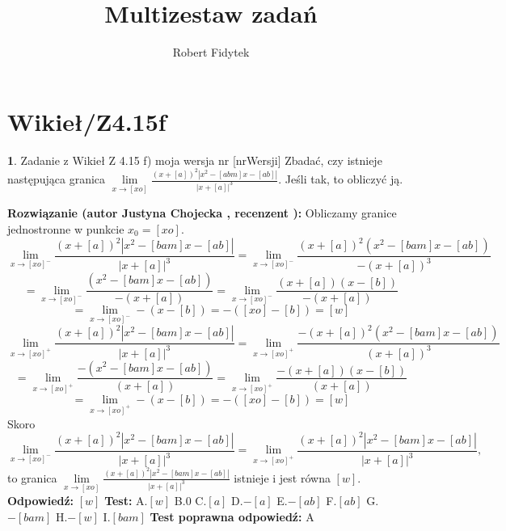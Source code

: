 \documentclass[12pt, a4paper]{article}
\title{Multizestaw zadań}
\author{Robert Fidytek}
\date{}
\theoremstyle{definition} %
\newtheorem{zad}{}
\newcommand{\kategoria}[1]{\section{#1}} %
\newcommand{\zadStart}[1]{\begin{zad}#1\newline} %
\newcommand{\zadStop}{\end{zad}}   %
\newcommand{\rozwStart}[2]{\noindent \textbf{Rozwiązanie (autor #1 , recenzent #2): }\newline} %
\newcommand{\rozwStop}{\newline}                                            %
\newcommand{\odpStart}{\noindent \textbf{Odpowiedź:}\newline}    %
\newcommand{\odpStop}{\newline}                                             %
\newcommand{\testStart}{\noindent \textbf{Test:}\newline} %
\newcommand{\testStop}{\newline} %
\newcommand{\kluczStart}{\noindent \textbf{Test poprawna odpowiedź:}\newline} %
\newcommand{\kluczStop}{\newline} %
\begin{document}
\maketitle


\kategoria{Wikieł/Z4.15f}
\zadStart{Zadanie z Wikieł Z 4.15 f) moja wersja nr [nrWersji]}
Zbadać, czy istnieje następująca granica $\lim\limits_{x\to [xo]}\frac{(x+[a])^{2}|x^{2}-[abm]x-[ab]|}{|x+[a]|^{3}}$. Jeśli tak, to obliczyć ją.
\zadStop
\rozwStart{Justyna Chojecka}{}
Obliczamy granice jednostronne w punkcie $x_{0}=[xo]$.
$$\lim\limits_{x\to [xo]^{-}}\frac{(x+[a])^{2}|x^{2}-[bam]x-[ab]|}{|x+[a]|^{3}}=\lim\limits_{x\to [xo]^{-}}\frac{(x+[a])^{2}(x^{2}-[bam]x-[ab])}{-(x+[a])^{3}}$$$$=\lim\limits_{x\to [xo]^{-}}\frac{(x^{2}-[bam]x-[ab])}{-(x+[a])}=\lim\limits_{x\to [xo]^{-}}\frac{(x+[a])(x-[b])}{-(x+[a])}$$$$=\lim\limits_{x\to [xo]^{-}}-(x-[b])=-([xo]-[b])=[w]$$
$$\lim\limits_{x\to [xo]^{+}}\frac{(x+[a])^{2}|x^{2}-[bam]x-[ab]|}{|x+[a]|^{3}}=\lim\limits_{x\to [xo]^{+}}\frac{-(x+[a])^{2}(x^{2}-[bam]x-[ab])}{(x+[a])^{3}}$$$$=\lim\limits_{x\to [xo]^{+}}\frac{-(x^{2}-[bam]x-[ab])}{(x+[a])}=\lim\limits_{x\to [xo]^{+}}\frac{-(x+[a])(x-[b])}{(x+[a])}$$$$=\lim\limits_{x\to [xo]^{+}}-(x-[b])=-([xo]-[b])=[w]$$
Skoro 
$$\lim\limits_{x\to [xo]^{-}}\frac{(x+[a])^{2}|x^{2}-[bam]x-[ab]|}{|x+[a]|^{3}}=\lim\limits_{x\to [xo]^{+}}\frac{(x+[a])^{2}|x^{2}-[bam]x-[ab]|}{|x+[a]|^{3}},$$
to granica $\lim\limits_{x\to [xo]}\frac{(x+[a])^{2}|x^{2}-[bam]x-[ab]|}{|x+[a]|^{3}}$ istnieje i jest równa $[w]$.
\rozwStop
\odpStart
$[w]$
\odpStop
\testStart
A.$[w]$
B.0
C.$[a]$
D.$-[a]$
E.$-[ab]$
F.$[ab]$
G.$-[bam]$
H.$-[w]$
I.$[bam]$
\testStop
\kluczStart
A
\kluczStop
\end{document}
